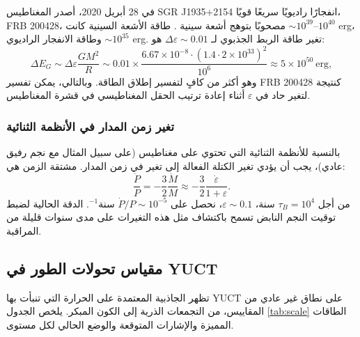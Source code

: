 \documentclass[11pt,a4paper]{article}
\newcommand{\eps}{\varepsilon}
\begin{document}
	في 28 أبريل 2020، أصدر المغناطيس SGR J1935+2154 انفجارًا راديويًا سريعًا قويًا، FRB 200428، مصحوبًا بتوهج أشعة سينية \cite{Geng2020}. طاقة الأشعة السينية كانت $\sim 10^{39}$–$10^{40}$ erg، وطاقة الانفجار الراديوي $\sim 10^{35}$ erg. تغير طاقة الربط الجذبوي لـ $\Delta\eps \sim 0.01$ هو:
	\begin{equation}
		\Delta E_G \sim \Delta\eps \frac{GM^2}{R} \sim 0.01 \times \frac{6.67\times10^{-8} \cdot (1.4\cdot 2\times10^{33})^2}{10^6} \approx 5\times10^{50}\ \text{erg},
	\end{equation}
	وهو أكثر من كافٍ لتفسير إطلاق الطاقة. وبالتالي، يمكن تفسير FRB 200428 كنتيجة لتغير حاد في $\eps$ أثناء إعادة ترتيب الحقل المغناطيسي في قشرة المغناطيس.
	
	\subsubsection{تغير زمن المدار في الأنظمة الثنائية}
	\label{subsubsec:magnetars-binary}
	
	بالنسبة للأنظمة الثنائية التي تحتوي على مغناطيس (على سبيل المثال مع نجم رفيق عادي)، يجب أن يؤدي تغير الكتلة الفعالة إلى تغير في زمن المدار. مشتقة الزمن هي:
	\begin{equation}
		\frac{\dot{P}}{P} = -\frac{3}{2} \frac{\dot{M}}{M} \approx -\frac{3}{2} \frac{\dot{\eps}}{1+\eps}.
		\label{eq:pdot}
	\end{equation}
	من أجل $\tau_B = 10^4$ سنة، $\eps \sim 0.1$، نحصل على $\dot{P}/P \sim 10^{-5}$ سنة$^{-1}$. الدقة الحالية لضبط توقيت النجم النابض تسمح باكتشاف مثل هذه التغيرات على مدى سنوات قليلة من المراقبة.
	
	\subsection{مقياس تحولات الطور في YUCT}
	\label{subsec:scale}
	
	تظهر الجاذبية المعتمدة على الحرارة التي تنبأت بها YUCT على نطاق غير عادي من المقاييس، من التجمعات الذرية إلى الكون المبكر. يلخص الجدول \ref{tab:scale} الطاقات المميزة والإشارات المتوقعة والوضع الحالي لكل مستوى.
	
\end{document}
